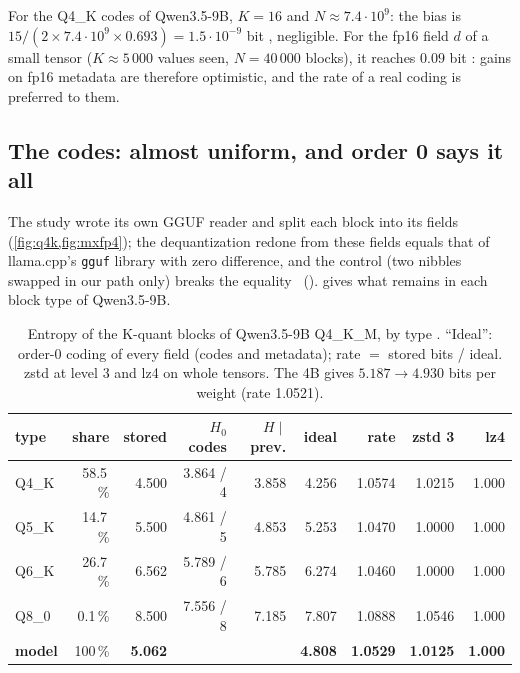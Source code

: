 For the Q4\_K codes of Qwen3.5-9B, $K = 16$ and $N \approx 7.4\cdot10^{9}$: the bias is $15/(2 \times 7.4\cdot10^{9} \times 0.693) = 1.5\cdot10^{-9}$ bit \calc, negligible. For the fp16 field $d$ of a small tensor ($K \approx 5\,000$ values seen, $N = 40\,000$ blocks), it reaches $0.09$ bit \calc: gains on fp16 metadata are therefore optimistic, and the rate of a real coding is preferred to them.

\subsection{The codes: almost uniform, and order 0 says it all}

The study wrote its own GGUF reader and split each block into its fields (\cref{fig:q4k,fig:mxfp4}); the dequantization redone from these fields equals that of llama.cpp's \texttt{gguf} library with zero difference, and the control (two nibbles swapped in our path only) breaks the equality \mes~().  gives what remains in each block type of Qwen3.5-9B.

\begin{table}[ht]
\centering\small
\caption[Entropy of the K-quant blocks of Qwen3.5-9B]{Entropy of the K-quant blocks of Qwen3.5-9B Q4\_K\_M, by type \mes. ``Ideal'': order-0 coding of every field (codes and metadata); rate $=$ stored bits / ideal. zstd at level 3 and lz4 on whole tensors. The 4B gives $5.187 \to 4.930$ bits per weight (rate 1.0521).}
\label{tab:ent-k}
\begin{tabular}{@{}lrrrrrrrr@{}}
\toprule
type & share & stored & $H_0$ codes & $H \mid$ prev. & ideal & rate & zstd 3 & lz4 \\
\midrule
Q4\_K & 58.5\,\% & 4.500 & 3.864 / 4 & 3.858 & 4.256 & 1.0574 & 1.0215 & 1.000 \\
Q5\_K & 14.7\,\% & 5.500 & 4.861 / 5 & 4.853 & 5.253 & 1.0470 & 1.0000 & 1.000 \\
Q6\_K & 26.7\,\% & 6.562 & 5.789 / 6 & 5.785 & 6.274 & 1.0460 & 1.0000 & 1.000 \\
Q8\_0 & 0.1\,\% & 8.500 & 7.556 / 8 & 7.185 & 7.807 & 1.0888 & 1.0546 & 1.000 \\
\midrule
\textbf{model} & 100\,\% & \textbf{5.062} & & & \textbf{4.808} & \textbf{1.0529} & \textbf{1.0125} & \textbf{1.000} \\
\bottomrule
\end{tabular}
\end{table}

